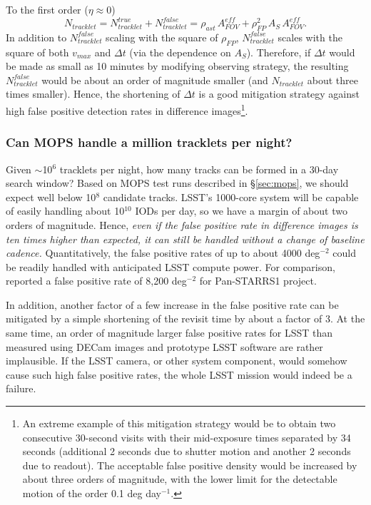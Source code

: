 To the first order ($\eta \approx 0$)
\begin{equation}
   N_{tracklet} =  N_{tracklet}^{true} + N_{tracklet}^{false} = \rho_{ast}  \, A_{FOV}^{eff} + \rho^2_{FP}  \, A_S \, A_{FOV}^{eff}. 
\end{equation}
In addition to $N_{tracklet}^{false}$ scaling with the square of $\rho_{FP}$, $N_{tracklet}^{false}$ scales with the square of
both $v_{max}$ and  $\Delta t$ (via the dependence on $A_S$). Therefore, if $\Delta t$ would be made
as small as 10 minutes by modifying observing strategy, the resulting $N_{tracklet}^{false}$ would be about an 
order of magnitude smaller (and $N_{tracklet}$ about three times smaller).  Hence, the shortening of $\Delta t$ is 
a good mitigation strategy against high false positive detection rates in difference images\footnote{An
extreme example of this mitigation strategy would be to obtain two consecutive 30-second visits with
their mid-exposure times separated 
by 34 seconds (additional 2 seconds due to shutter motion and another 2 seconds due to readout). 
The acceptable false positive density would be increased by about three orders of magnitude, with the
lower limit for the detectable motion of the order 0.1 deg day$^{-1}$.}. 



\subsubsection{Can MOPS handle a million tracklets per night?} 

Given $\sim$10$^6$ tracklets per night, how many tracks can be formed in a 30-day search window? 
Based on MOPS test runs described in \S\ref{sec:mops}, we should expect well below 10$^8$ candidate
tracks. LSST's 1000-core system will be capable of easily handling about 10$^{10}$ IODs per day, so we 
have a margin of about two orders of magnitude. Hence, {\it even if the false positive rate in difference 
images is ten times higher than expected, it can still be handled without a change of baseline cadence.} 
Quantitatively, the false positive rates of up to about 4000 deg$^{-2}$ could be readily handled with 
anticipated LSST compute power. For comparison, \cite{denneau13} reported a false positive 
rate of 8,200 deg$^{-2}$ for Pan-STARRS1 project. 

In addition, another factor of a few increase in the false positive rate can be mitigated by a simple
shortening of the revisit time by about a factor of 3. At the same time, an order of magnitude 
larger false positive rates for LSST than measured using DECam images and prototype LSST software
are rather implausible. If the LSST camera, or other system component, would somehow
cause such high false positive rates, the whole LSST mission would indeed be a failure. 

